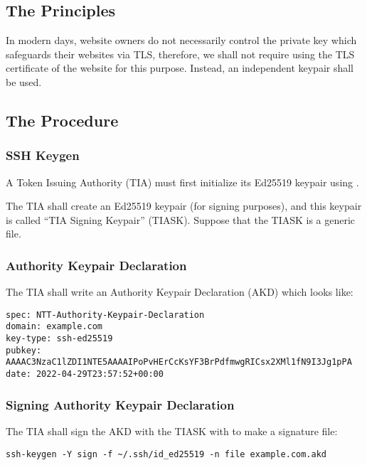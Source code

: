 \documentclass[a4paper,10pt]{article}
\begin{document}
\subsection{The Principles}

In modern days, website owners do not necessarily control the private key which safeguards their websites via TLS,
therefore, we shall not require using the TLS certificate of the website for this purpose.
Instead, an independent keypair shall be used.


\subsection{The Procedure}

\subsubsection{SSH Keygen}

A Token Issuing Authority (TIA) must first initialize its Ed25519 keypair using .

The TIA shall create an Ed25519 keypair (for signing purposes), and this keypair is called ``TIA Signing Keypair'' (TIASK).
Suppose that the TIASK is a generic  file.

\subsubsection{Authority Keypair Declaration}

The TIA shall write an Authority Keypair Declaration (AKD) which looks like:

\begin{lstlisting}
spec: NTT-Authority-Keypair-Declaration
domain: example.com
key-type: ssh-ed25519
pubkey: AAAAC3NzaC1lZDI1NTE5AAAAIPoPvHErCcKsYF3BrPdfmwgRICsx2XMl1fN9I3Jg1pPA
date: 2022-04-29T23:57:52+00:00
\end{lstlisting}

\subsubsection{Signing Authority Keypair Declaration}

The TIA shall sign the AKD with the TIASK with  to make a signature file:

\begin{lstlisting}
ssh-keygen -Y sign -f ~/.ssh/id_ed25519 -n file example.com.akd
\end{lstlisting}
\end{document}
